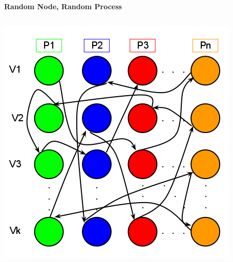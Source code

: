 \documentclass[final]{beamer}
\begin{document}
\begin{frame}[t]
\begin{columns}[t]
\begin{column}{0.60\paperwidth}
\begin{columns}[t,totalwidth=0.60\paperwidth]
\begin{column}{0.28\paperwidth}
\begin{columns}[t,totalwidth=0.28\paperwidth]
\begin{column}{0.12\paperwidth}
							\end{column}
						\end{columns}
					\end{column}
				\end{columns}
				\begin{columns}[t,totalwidth=0.60\paperwidth]
					\begin{column}{0.28\paperwidth}
						\begin{center} \bf{Random Node, Random Process} \end{center}
						\begin{columns}[t,totalwidth=0.28\paperwidth]
							\begin{column}{0.12\paperwidth}
								\begin{center} \includegraphics[width=0.12\paperwidth]{img/linked_list/rand_proc_rand_node} \end{center}
							\end{column}
							\begin{column}{0.12\paperwidth}

\end{column}
\end{columns}
\end{column}
\end{columns}
\end{column}
\end{columns}
\end{frame}
\end{document}
